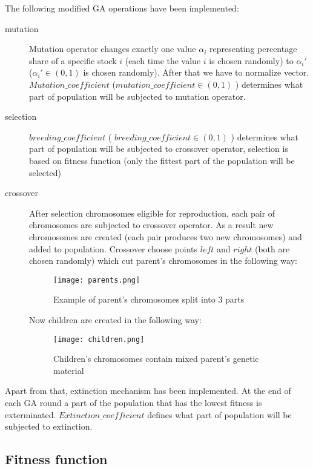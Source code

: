 The following modified GA operations have been implemented:
\begin{description}
  \item [mutation]
      Mutation operator changes exactly one value $ \alpha_{i} $ representing percentage share of a specific stock $i$ (each time the value $i$ is chosen randomly)
      to $\alpha_{i}'$ ($\alpha_{i}' \in (0,1)$ is chosen randomly). 
      After that we have to normalize vector.
      $Mutation\_coefficient$ ($mutation\_coefficient \in (0,1)$ ) determines what part of population will be subjected to mutation operator.
  \item [selection]
      $breeding\_coefficient$ ( $breeding\_coefficient \in (0,1)$ ) determines what part of population will be subjected to crossover operator, selection is based on 
      fitness function (only the fittest part of the population will be selected)
  \item [crossover]
      After selection chromosomes eligible for reproduction, each pair of chromosomes are subjected to crossover operator. As a result new chromosomes are created (each pair
      produces two new chromosomes) and added to population. Crossover choose points $left$  and $right$ (both are chosen randomly) which cut parent's chromosomes in the following
      way: 
	  \begin{figure}[!ht]
	    \begin{center}
	      \texttt{[image: parents.png]}
	    \end{center}
	    \caption{Example of parent's chromosomes split into 3 parts}
	  \end{figure}

	Now children are created in the following way:    
	  \begin{figure}[!ht]
	    \begin{center}
	      \texttt{[image: children.png]}
	    \end{center}
	    \caption{Children's chromosomes contain mixed parent's genetic material}
	  \end{figure}

\end{description}

Apart from that, extinction mechanism has been implemented.
At the end of each GA round a part of the population that has the lowest fitness is exterminated.
$Extinction\_coefficient$ defines what part of population will be subjected to extinction.
 
\subsection{Fitness function}

